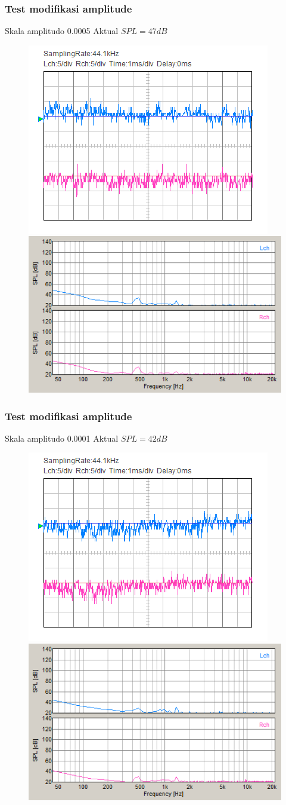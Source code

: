 \documentclass[table,dvipsnames,10pt]{beamer}
\begin{document}
	\begin{frame}[fragile]
	\frametitle{Test modifikasi amplitude}
	\begin{exampleblock}{Skala amplitudo 0.0005}
		Aktual $SPL = 47 dB$
		\begin{figure}[H]
			\centering
			\includegraphics[width=0.4\linewidth]{result/day_4/500Hz/tone00005}
			\includegraphics[width=0.45\linewidth]{result/day_4/500Hz/fft_tone00005}
		\end{figure}
	\end{exampleblock}
	\end{frame}

	\begin{frame}[fragile]
	\frametitle{Test modifikasi amplitude}
	\begin{exampleblock}{Skala amplitudo 0.0001}
		Aktual $SPL = 42 dB$
		\begin{figure}[H]
			\centering
			\includegraphics[width=0.4\linewidth]{result/day_4/500Hz/tone00001}
			\includegraphics[width=0.45\linewidth]{result/day_4/500Hz/fft_tone00001}
		\end{figure}
	\end{exampleblock}
	\end{frame}
\end{document}
